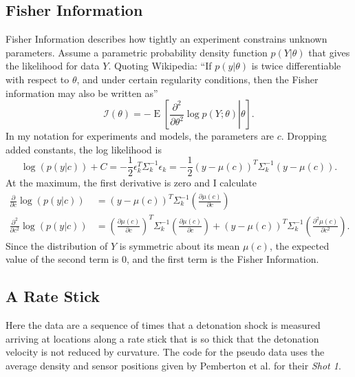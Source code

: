 \documentclass[11pt]{article}
\begin{document}
\subsection{Fisher Information}
\label{sec:fisher-information}

Fisher Information describes how tightly an experiment constrains
unknown parameters.  Assume a parametric probability density function
$p(Y|\theta)$ that gives the likelihood for data $Y$.  Quoting
Wikipedia: ``If $p(y|\theta)$ is twice differentiable with respect to
$\theta$, and under certain regularity conditions, then the Fisher
information may also be written as''
\begin{equation*}
  \mathcal{I}(\theta) = - \operatorname{E}
  \left[\left. \frac{\partial^2}{\partial\theta^2} \log
      p(Y;\theta)\right|\theta \right].
\end{equation*}
In my notation for experiments and models, the parameters are $c$.
Dropping added constants, the log likelihood is
\begin{equation*}
  \log(p(y|c)) + C = -\frac{1}{2}\epsilon_k^T \Sigma_k^{-1} \epsilon_k
  = -\frac{1}{2}(y-\mu(c))^T \Sigma_k^{-1} (y-\mu(c)).
\end{equation*}
At the maximum, the first derivative is zero and I calculate
\newcommand{\dmudc}{\left(\frac{\partial \mu(c)}{\partial c} \right)}
\begin{align*}
  \frac{\partial}{\partial c} \log(p(y|c)) &= 
      (y-\mu(c))^T \Sigma_k^{-1} \dmudc \\
  \frac{\partial^2}{\partial c^2} \log(p(y|c)) &=
      \dmudc^T \Sigma_k^{-1} \dmudc +  (y-\mu(c))^T \Sigma_k^{-1}
       \left(\frac{\partial^2 \mu(c)}{\partial c^2} \right).
\end{align*}
Since the distribution of $Y$ is symmetric about its mean $\mu(c)$,
the expected value of the second term is 0, and the first term is the
Fisher Information.

\subsection{A Rate Stick}
\label{sec:rate-stick}

Here the data are a sequence of times that a detonation shock is
measured arriving at locations along a rate stick that is so thick
that the detonation velocity is not reduced by curvature.  The code
for the pseudo data uses the average density and sensor positions given
by Pemberton et al.\cite{Pemberton9501} for their \emph{Shot 1}.
\end{document}
